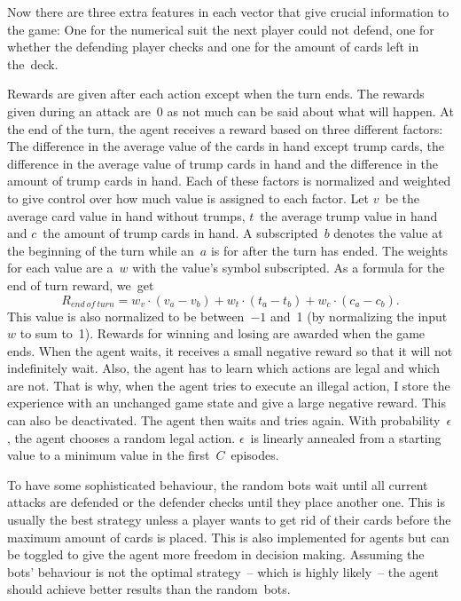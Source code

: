 \documentclass[a4paper,titlepage]{article}
\begin{document}
Now there are three extra features in each vector that give crucial information to the game: One for the numerical suit the next player could not defend, one for whether the defending player checks and one for the amount of cards left in the~deck.

Rewards are given after each action except when the turn ends. The rewards given during an attack are~0 as not much can be said about what will happen. At the end of the turn, the agent receives a reward based on three different factors: The difference in the average value of the cards in hand except trump cards, the difference in the average value of trump cards in hand and the difference in the amount of trump cards in hand. Each of these factors is normalized and weighted to give control over how much value is assigned to each factor.
Let $v$~be the average card value in hand without trumps, $t$~the average trump value in hand and $c$~the amount of trump cards in hand. A subscripted~$b$ denotes the value at the beginning of the turn while an~$a$ is for after the turn has ended. The weights for each value are a~$w$ with the value's symbol subscripted. As a formula for the end of turn reward, we~get
\begin{equation*}
  R_{end\ of\ turn} = w_v \cdot (v_a - v_b) + w_t \cdot (t_a - t_b) + w_c \cdot (c_a - c_b).
\end{equation*}
This value is also normalized to be between~$-1$ and~1 (by normalizing the input~$w$ to sum to~1). Rewards for winning and losing are awarded when the game ends. When the agent waits, it receives a small negative reward so that it will not indefinitely wait. Also, the agent has to learn which actions are legal and which are not. That is why, when the agent tries to execute an illegal action, I store the experience with an unchanged game state and give a large negative reward. This can also be deactivated. The agent then waits and tries again. With probability~$\epsilon$, the agent chooses a random legal action. $\epsilon$~is linearly annealed from a starting value to a minimum value in the first~$C$~episodes.

To have some sophisticated behaviour, the random bots wait until all current attacks are defended or the defender checks until they place another one. This is usually the best strategy unless a player wants to get rid of their cards before the maximum amount of cards is placed. This is also implemented for agents but can be toggled to give the agent more freedom in decision making. Assuming the bots' behaviour is not the optimal strategy~-- which is highly likely~-- the agent should achieve better results than the random~bots.
\end{document}
